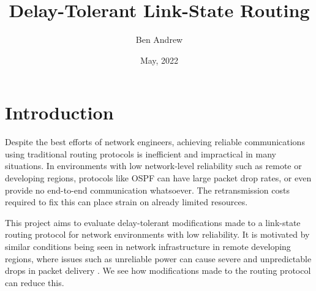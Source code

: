\documentclass[withindex,glossary,openany]{cam-thesis}
\title{Delay-Tolerant Link-State Routing}
\author{Ben Andrew}
\date{May, 2022}
\begin{document}
\frontmatter{}



\listoffigures


\pagebreak

\chapter{Introduction}



Despite the best efforts of network engineers, achieving reliable communications using traditional routing protocols is inefficient and impractical in many situations. In environments with low network-level reliability such as remote or developing regions, protocols like OSPF can have large packet drop rates, or even provide no end-to-end communication whatsoever. The retransmission costs required to fix this can place strain on already limited resources.

This project aims to evaluate delay-tolerant modifications made to a link-state routing protocol for network environments with low reliability. It is motivated by similar conditions being seen in network infrastructure in remote developing regions, where issues such as unreliable power can cause severe and unpredictable drops in packet delivery \cite{DEMMER2007}. We see how modifications made to the routing protocol can reduce this.



\end{document}
